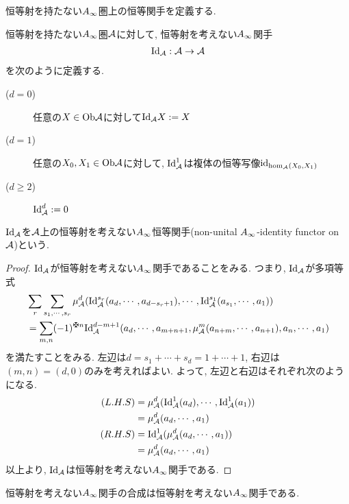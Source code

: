 \documentclass[uplatex, a4paper, 14Q, dvipdfmx]{jsarticle}
\begin{document}
恒等射を持たない$A_{\infty}$圏上の恒等関手を定義する. 

\begin{definition} \label{def_identity__Ainf_func}
  恒等射を持たない$A_{\infty}$圏$\mathcal{A}$に対して, 恒等射を考えない$A_{\infty}$関手
  \begin{align*}
    \mathrm{Id}_{\mathcal{A}} : \mathcal{A} \to \mathcal{A}
  \end{align*}
  を次のように定義する. 
  \begin{description}
    \item[($d=0$)] 任意の$X \in \mathrm{Ob}\mathcal{A}$に対して$\mathrm{Id}_{\mathcal{A}} X := X$
    \item[($d=1$)] 任意の$X_0,X_1 \in \mathrm{Ob}\mathcal{A}$に対して, $\mathrm{Id}_{\mathcal{A}}^1$は複体の恒等写像$\mathrm{id}_{\hom_{\mathcal{A}}(X_0,X_1)}$
    \item[($d \geq 2$)] $\mathrm{Id}_{\mathcal{A}}^d := 0$
  \end{description}
  $\mathrm{Id}_{\mathcal{A}}$を$\mathcal{A}$上の恒等射を考えない$A_{\infty}$恒等関手(non-unital $A_{\infty}$-identity functor on $\mathcal{A}$)という.
\end{definition}

\begin{proof}
  $\mathrm{Id}_{\mathcal{A}}$が恒等射を考えない$A_{\infty}$関手であることをみる. 
  つまり, $\mathrm{Id}_{\mathcal{A}}$が多項等式
  \begin{align*}
    &\sum_r \sum_{s_1,\cdots,s_r} \mu^d_\A (\Id_\A^{s_r} (a_d,\cdots,a_{d-s_r+1}), \cdots, \Id_\A^{s_1}(a_{s_1},\cdots,a_1)) \\ 
    &= \sum_{m,n} (-1)^{\maltese n} \Id_\A^{d-m+1} (a_d,\cdots,a_{m+n+1}, \mu^m_\A(a_{n+m},\cdots,a_{n+1}), a_n,\cdots,a_1)
  \end{align*}
  を満たすことをみる.
  左辺は$d = s_1+\cdots+s_d = 1+\cdots+1$, 右辺は$(m,n)=(d,0)$のみを考えればよい. 
  よって, 左辺と右辺はそれぞれ次のようになる. 
  \begin{align*}
    (L.H.S) 
    &= \mu^d_{\mathcal{A}}(\mathrm{Id}_{\mathcal{A}}^1(a_d), \cdots, \mathrm{Id}_{\mathcal{A}}^1(a_1)) \\
    &= \mu^d_{\mathcal{A}}(a_d, \cdots, a_1) \\
    (R.H.S)
    &= \mathrm{Id}_{\mathcal{A}}^1(\mu^d_{\mathcal{A}}(a_d, \cdots, a_1)) \\
    &= \mu^d_{\mathcal{A}}(a_d, \cdots, a_1)
  \end{align*}
  以上より, $\mathrm{Id}_{\mathcal{A}}$は恒等射を考えない$A_{\infty}$関手である.
\end{proof}

恒等射を考えない$A_{\infty}$関手の合成は恒等射を考えない$A_{\infty}$関手である. 
\end{document}

